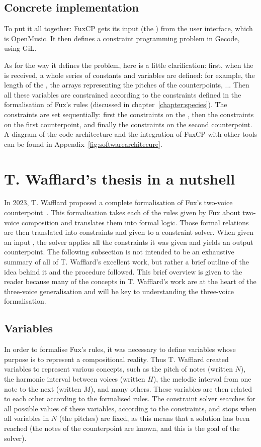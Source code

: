 \subsection{Concrete implementation}
To put it all together: FuxCP gets its input (the \cf) from the user interface, which is OpenMusic. It then defines a constraint programming problem in Gecode, using GiL. 

As for the way it defines the problem, here is a little clarification: first, when the \cfs is received, a whole series of constants and variables are defined: for example, the length of the \cf, the arrays representing the pitches of the counterpoints, ...
Then all these variables are constrained according to the constraints defined in the formalisation of Fux's rules (discussed in chapter~\ref{chapter:species}). The constraints are set sequentially: first the constraints on the \cf, then the constraints on the first counterpoint, and finally the constraints on the second counterpoint. A diagram of the code architecture and the integration of FuxCP with other tools can be found in Appendix~\ref{fig:softwarearchitecure}.


\section{T. Wafflard's thesis in a nutshell}\label{section:thomas-in-a-nutshell}

In 2023, T. Wafflard proposed a complete formalisation of Fux's two-voice counterpoint~\cite{wafflard2023}. This formalisation takes each of the rules given by Fux about two-voice composition and translates them into formal logic. Those formal relations are then translated into constraints and given to a constraint solver. When given an input \cf, the solver applies all the constraints it was given and yields an output counterpoint. The following subsection is not intended to be an exhaustive summary of all of T. Wafflard's excellent work, but rather a brief outline of the idea behind it and the procedure followed. This brief overview is given to the reader because many of the concepts in T. Wafflard's work are at the heart of the three-voice generalisation and will be key to understanding the three-voice formalisation.

\subsection{Variables} \label{Wafflard-variables}
In order to formalise Fux's rules, it was necessary to define variables whose purpose is to represent a compositional reality. Thus T. Wafflard created variables to represent various concepts, such as the pitch of notes (written $N$), the harmonic interval between voices (written $H$), the melodic interval from one note to the next (written $M$), and many others. These variables are then related to each other according to the formalised rules. The constraint solver searches for all possible values of these variables, according to the constraints, and stops when all variables in $N$ (the pitches) are fixed, as this means that a solution has been reached (the notes of the counterpoint are known, and this is the goal of the solver).

